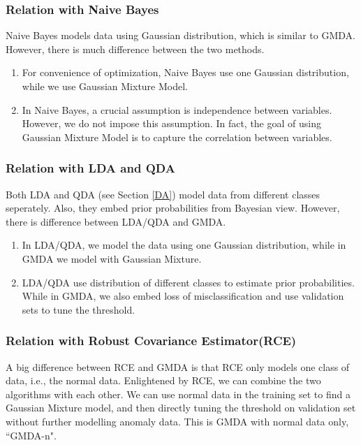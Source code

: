 \documentclass[english]{article}
\begin{document}
\subsubsection{Relation with Naive Bayes}
\par

Naive Bayes models data using Gaussian distribution, which is similar to GMDA. However, there is much difference between the two methods.
\begin{enumerate}
\item For convenience of optimization, Naive Bayes use one Gaussian distribution, while we use Gaussian Mixture Model.
\item In Naive Bayes, a crucial assumption is independence between variables. However, we do not impose this assumption. In fact, the goal of using Gaussian Mixture Model is to capture the correlation between variables.
\end{enumerate}

\subsubsection{Relation with LDA and QDA}
\par

Both LDA and QDA (see Section \ref{DA}) model data from different classes seperately. Also, they embed prior probabilities from Bayesian view. However, there is difference between LDA/QDA and GMDA.
\begin{enumerate}
\item In LDA/QDA, we model the data using one Gaussian distribution, while in GMDA we model with Gaussian Mixture.
\item LDA/QDA use distribution of different classes to estimate prior probabilities. While in GMDA, we also embed loss of misclassification and use validation sets to tune the threshold. 
\end{enumerate}

\subsubsection{Relation with Robust Covariance Estimator(RCE)}
\par

A big difference between RCE and GMDA is that RCE only models one class of data, i.e., the normal data. Enlightened by RCE, we can combine the two algorithms with each other. We can use normal data in the training set to find a Gaussian Mixture model, and then directly tuning the threshold on validation set without further modelling anomaly data. This is GMDA with normal data only, ``GMDA-n".
\end{document}
